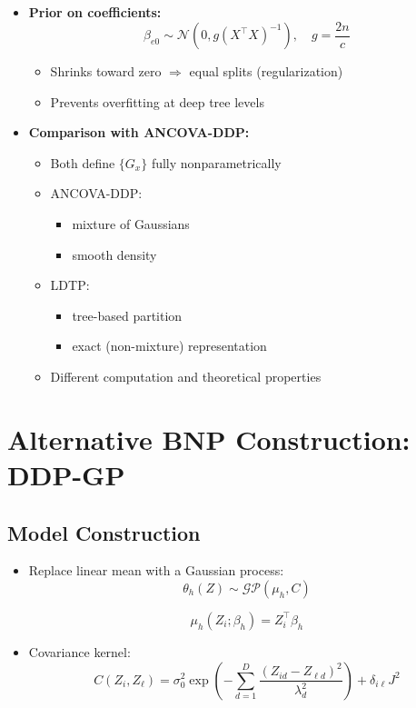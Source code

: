 \documentclass[12pt,oneside]{book}
\numberwithin{equation}{section}
\theoremstyle{definition}
\theoremstyle{plain}
\theoremstyle{remark}
\begin{document}
\begin{itemize}
\item \textbf{Prior on coefficients:}
\[
\beta_{e0} \sim \mathcal{N}\left(0, g(X^\top X)^{-1}\right),
\quad g = \frac{2n}{c}
\]

\begin{itemize}
\item Shrinks toward zero $\Rightarrow$ equal splits (regularization)
\item Prevents overfitting at deep tree levels
\end{itemize}

\item \textbf{Comparison with ANCOVA-DDP:}
\begin{itemize}
\item Both define $\{G_x\}$ fully nonparametrically
\item ANCOVA-DDP:
\begin{itemize}
\item mixture of Gaussians
\item smooth density
\end{itemize}
\item LDTP:
\begin{itemize}
\item tree-based partition
\item exact (non-mixture) representation
\end{itemize}
\item Different computation and theoretical properties
\end{itemize}
\end{itemize}

\section{Alternative BNP Construction: DDP-GP}

\subsection{Model Construction}

\begin{itemize}
\item Replace linear mean with a Gaussian process:
\[
\theta_h(Z) \sim \mathcal{GP}(\mu_h, C)
\]

\[
\mu_h(Z_i; \beta_h) = Z_i^\top \beta_h
\]

\item Covariance kernel:
\[
C(Z_i, Z_\ell) =
\sigma_0^2 \exp\left(-\sum_{d=1}^D \frac{(Z_{id} - Z_{\ell d})^2}{\lambda_d^2}\right)
+ \delta_{i\ell} J^2
\]
\end{itemize}
\end{document}
